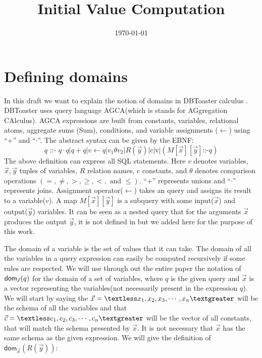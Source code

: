 \documentclass[12pt]{article}
\begin{document}
\title{Initial Value Computation}
\author{}
\date{\today}
\maketitle
\newcommand{\dom}{\textsf{dom}}
\newcommand{\arity}{\textsf{arity}}
\newcommand{\InputVars}{\textsf{InputVars}}
\newcommand{\OutputVars}{\textsf{OutputVars}}
\newcommand{\Rel}{\textsf{Rel}}
\newcommand{\Ext}{\textsf{Ext}}

\section{Defining domains}
\label{sec:definingdomains}
In this draft we want to explain the notion of domains in DBToaster calculus \cite{1}. DBToaster uses query language AGCA(which is stands for AGgregation CAlculus). 
AGCA expressions are built from constants, variables, relational atoms, aggregate sums (Sum), conditions, and variable assignments ($\gets$) using ``+''  and ``$\cdot$''. The abstract syntax can be given by the EBNF:
\begin{equation}
\label{def:agca}
q\text{ ::- }q\cdot q | q + q|v \gets q |v_{1}\theta v_{2}|R(\vec{y})|\text{c}|\text{v}|(M[\vec{x}][\vec{y}]\text{::-}q)
\end{equation}
The above definition can express all SQL statements. Here $v$ denotes variables, $\vec{x},\vec{y}$ tuples of variables, $R$ relation names, $c$ constants, and $\theta$ denotes comparison operations $(=,\neq, >, \geq, <, \text{ and }\leq)$.
 ``+'' represents unions and ``$\cdot$'' represents joins. Assignment operator($\gets$) takes an query and assigns its result to a variable($v$). A map $M[\vec{x}][\vec{y}]$ is a subquery with some input($\vec{x}$) and output($\vec{y}$) variables. It can be seen as a nested query that for the arguments $\vec{x}$ produces the output $\vec{y}$, it is not defined in \cite{1} but we added here for the purpose of this work.

The domain of a variable is the set of values that it can take. The domain of all the variables in a query expression can easily be computed recursively if some rules are respected. We will use through out the entire paper the notation of $\text{\dom{}}_{\vec x}(q)$ for the domain of a set of variables, where $q$ is the given query and $\vec x$ is a vector representing the variables(not necessarily present in the expression $q$). We will start by saying the $\vec x=\textless x_1,x_2,x_3,\cdots,x_n\textgreater$ will be the schema of all the variables 
and that $\vec c=\textless c_1,c_2,c_3,\cdots,c_n\textgreater$ will be the vector of all constants, that will match the schema presented by $\vec x$. It is not necessary that $\vec{x}$  has the same schema as the given expression. We will give the definition of $\dom{}_{\vec x}(R(\vec y))$:
\end{document}
